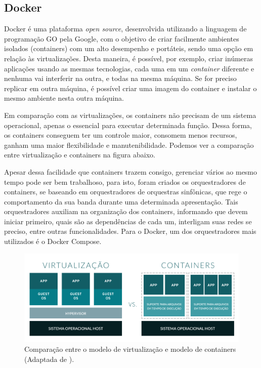 \subsection{Docker}
\label{fund:docker}
Docker é uma plataforma \textit{open source}, desenvolvida utilizando a linguagem de programação GO pela Google, com o objetivo de criar facilmente  ambientes isolados (containers) com um alto desempenho e portáteis, sendo uma opção em relação às virtualizações. Desta maneira, é possível, por exemplo, criar inúmeras aplicações usando as mesmas tecnologias, cada uma em um \textit{container} diferente e nenhuma vai interferir na outra, e todas na mesma máquina. Se for preciso replicar em outra máquina, é possível criar uma imagem do container e instalar o mesmo ambiente nesta outra máquina.

Em comparação com as virtualizações, os containers não precisam de um sistema operacional, apenas o essencial para executar determinada função. Dessa forma, os containers conseguem ter um controle maior, consomem menos recursos, ganham uma maior flexibilidade e manutenibilidade. Podemos ver a comparação entre virtualização e containers na figura abaixo.

Apesar dessa facilidade que containers trazem consigo, gerenciar vários ao mesmo tempo pode ser bem trabalhoso, para isto, foram criados os orquestradores de containers, se baseando em orquestradores de orquestras sinfônicas, que rege o comportamento da sua banda durante uma determinada apresentação. Tais orquestradores auxiliam na organização dos containers, informando que devem iniciar primeiro, quais são as dependências de cada um, interligam suas redes se preciso, entre outras funcionalidades. Para o Docker, um dos orquestradores mais utilizados é o Docker Compose.

\begin{figure}[H]
  \centering
  \includegraphics[width=.80\textwidth]{assets/virtualization-vs-containers.png} 
  \caption{Comparação entre o modelo de virtualização e modelo de containers (Adaptada de \cite{redhat2020Containers}).}
  \label{fig:virtualization-vs-containers}
\end{figure}

